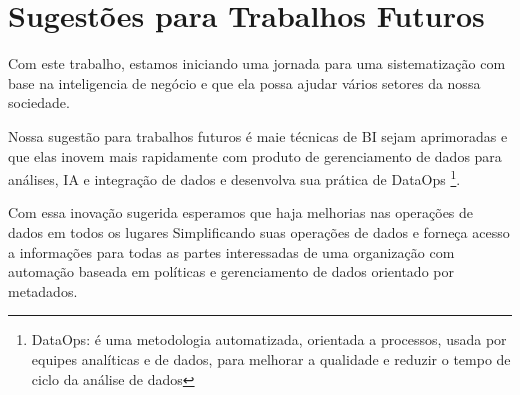 \section{Sugest\~{o}es para Trabalhos Futuros}

Com este trabalho, estamos iniciando uma jornada para uma sistematiza\c{c}\~{a}o com base na inteligencia de neg\'{o}cio e que ela possa ajudar vários setores da nossa sociedade.

Nossa sugest\~{a}o para trabalhos futuros \'{e} maie técnicas de BI sejam aprimoradas e que elas inovem mais rapidamente com produto de gerenciamento de dados para análises, IA e integra\c{c}\~{a}o de dados e desenvolva sua prática de DataOps \footnote{DataOps: \'{e} uma metodologia automatizada, orientada a processos, usada por equipes analíticas e de dados, para melhorar a qualidade e reduzir o tempo de ciclo da análise de dados}. 

Com essa inova\c{c}\~{a}o sugerida esperamos que haja melhorias nas opera\c{c}\~{o}es de dados em todos os lugares Simplificando suas opera\c{c}\~{o}es de dados e forne\c{c}a acesso a informa\c{c}\~{o}es para todas as partes interessadas de uma organiza\c{c}\~{a}o com automa\c{c}\~{a}o baseada em políticas e gerenciamento de dados orientado por metadados.
